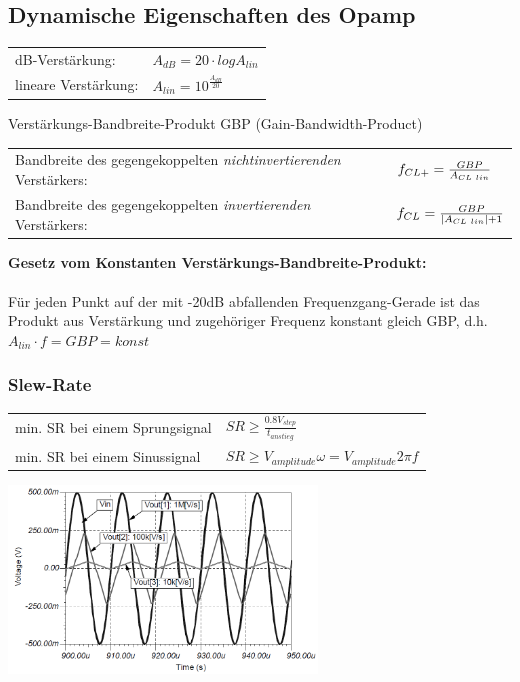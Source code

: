 		\subsection{Dynamische Eigenschaften des Opamp}
			\begin{tabular}{ll}
				dB-Verstärkung:&
        $A_{dB}=20 \cdot log A_{lin}$\\
        lineare Verstärkung:&
        $A_{lin}=10^{\frac{A_{dB}}{20}}$\\
			\end{tabular}
      Verstärkungs-Bandbreite-Produkt GBP (Gain-Bandwidth-Product)\\
      \begin{tabular}{ll}
        Bandbreite des gegengekoppelten {\it nichtinvertierenden} Verstärkers:&
        $f_{CL+}=\frac{GBP}{A_{CL \hspace{1mm}lin}}$\\
        Bandbreite des gegengekoppelten {\it invertierenden} Verstärkers: &
        $f_{CL}=\frac{GBP}{\left| A_{CL \hspace{1mm}lin}\right|+1}$\\
      \end{tabular}
      {\bf Gesetz vom Konstanten Verstärkungs-Bandbreite-Produkt:} \\ \\
      	Für jeden Punkt auf der mit -20dB abfallenden Frequenzgang-Gerade ist das
        Produkt aus Verstärkung und zugehöriger Frequenz konstant gleich GBP, d.h. $A_{lin}\cdot f=GBP=konst$\\
      
		\subsubsection{Slew-Rate}
		\begin{tabular}{ll}
			min. SR bei einem Sprungsignal &
			$SR\geq\frac{0.8V_{step}}{t_{anstieg}}$\\ 
			min. SR bei einem Sinussignal & 
			$SR\geq V_{amplitude}\omega=V_{amplitude}2\pi f$\\
		\end{tabular}

		\includegraphics[height=5cm]{./bilder/slew-rate.png}\\